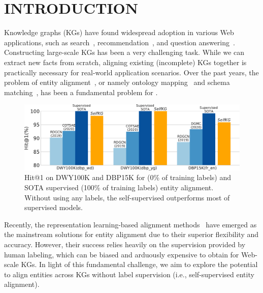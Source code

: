 

\section{INTRODUCTION} \label{sec:intr}


Knowledge graphs (KGs) have found widespread adoption in various Web applications, such as search~\cite{eder2012knowledge,paulheim2017knowledge}, recommendation~\cite{guo2020survey,li2020alimekg}, and question answering~\cite{yang2018hotpotqa,lewis2020retrieval}.  
Constructing large-scale KGs has been a very challenging task.
While we can extract new facts from scratch, aligning existing (incomplete) KGs together is practically necessary for real-world application scenarios. 
Over the past years, the problem of entity alignment~\cite{GCN-Align,tang2019bert-int}, or namely ontology mapping~\cite{li2008rimom} and schema matching~\cite{li2014rule}, has been a fundamental problem for .

\begin{figure}[t]
\setlength{\abovecaptionskip}{-0.2mm}
\centering   
\includegraphics[width=\columnwidth]{img/intro.pdf}
\vspace{-1.5mm}
\caption{Hit@1 on DWY100K and DBP15K for \solution (0\% of training labels) and SOTA supervised (100\% of training labels) entity alignment. \textmd{Without using any labels, the self-supervised \solution outperforms most of supervised models.}}
\label{fig:intro}
\vspace{-3.5mm}
\end{figure}

Recently, the representation learning-based alignment methods~\cite{MTransE,GCN-Align,CEAFF,tang2019bert-int,wu2019relation} have emerged as the mainstream solutions for entity alignment due to their superior flexibility and accuracy. 
However, their success relies heavily on the supervision provided by human labeling, which can be biased and arduously expensive to obtain for Web-scale KGs. 
In light of this fundamental challenge, we aim to explore the potential to align entities across KGs without label supervision (i.e., self-supervised entity alignment). 

